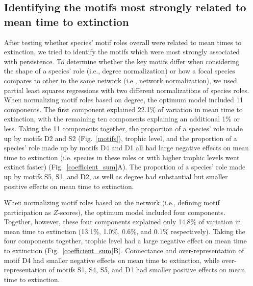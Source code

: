 \documentclass[12pt]{article}
\begin{document}
	\subsection*{Identifying the motifs most strongly related to mean time to extinction}

        After testing whether species' motif roles overall were related to mean times to extinction, we tried to identify the motifs which were most strongly associated with persistence. 
        To determine whether the key motifs differ when considering the shape of a species' role (i.e., degree normalization) or how a focal species compares to other in the same network (i.e., network normalization), we used partial least squares regressions with two different normalizations of species roles.
		When normalizing motif roles based on degree, the optimum model included 11 components.
		The first component explained 22.1\% of variation in mean time to extinction, with the remaining ten components explaining an additional 1\% or less.
		Taking the 11 components together, the proportion of a species' role made up by motifs D2 and S2 (Fig.~\ref{motifs}), trophic level, and the proportion of a species' role made up by motifs D4 and D1 all had large negative effects on mean time to extinction (i.e. species in these roles or with higher trophic levels went extinct faster) (Fig.~\ref{coefficient_sum}A).
		The proportion of a species' role made up by motifs S5, S1, and D2, as well as degree had substantial but smaller positive effects on mean time to extinction.


		When normalizing motif roles based on the network (i.e., defining motif participation as $Z$-scores), the optimum model included four components.
		Together, however, these four components explained only 14.8\% of variation in mean time to extinction (13.1\%, 1.0\%, 0.6\%, and 0.1\% respectively).
		Taking the four components together, trophic level had a large negative effect on mean time to extinction (Fig.~\ref{coefficient_sum}B).
		Connectance and over-representation of motif D4 had smaller negative effects on mean time to extinction, while over-representation of motifs S1, S4, S5, and D1 had smaller positive effects on mean time to extinction.
\end{document}
